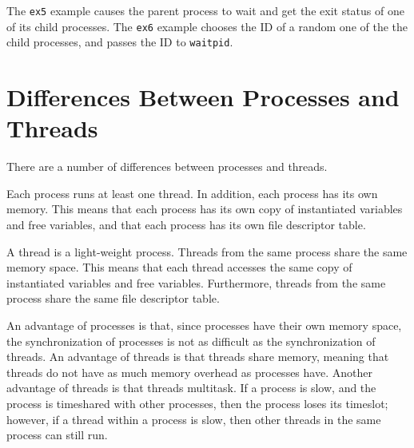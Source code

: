 The \texttt{ex5} example causes the parent process to wait and get the exit status of one of its child processes.  The \texttt{ex6} example chooses the ID of a random one of the the child processes, and passes the ID to \texttt{waitpid}.

\section{Differences Between Processes and Threads}
There are a number of differences between processes and threads.

Each process runs at least one thread.  In addition, each process has its own memory.  This means that each process has its own copy of instantiated variables and free variables, and that each process has its own file descriptor table.  

A thread is a light-weight process.  Threads from the same process share the same memory space.  This means that each thread accesses the same copy of instantiated variables and free variables.  Furthermore, threads from the same process share the same file descriptor table.

An advantage of processes is that, since processes have their own memory space, the synchronization of processes is not as difficult  as the synchronization of threads.  An advantage of threads is that threads share memory, meaning that threads do not have as much memory overhead as processes have.  Another advantage of threads is that threads multitask.  If a process is slow, and the process is timeshared with other processes, then the process loses its timeslot; however, if a thread within a process is slow, then other threads in the same process can still run.

\ignore{

}